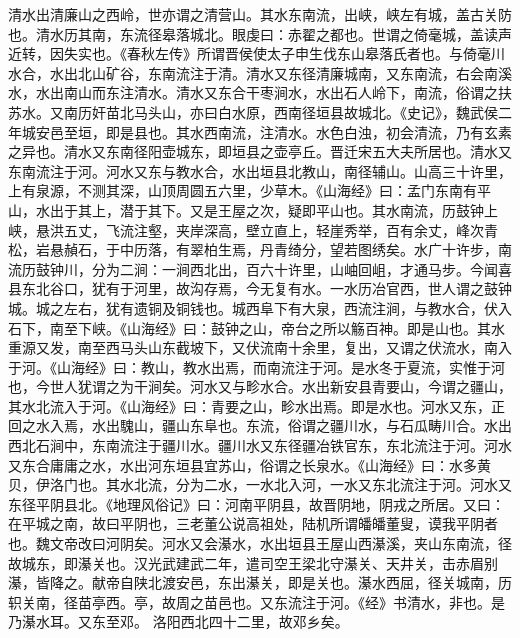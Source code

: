 \documentclass[12pt,UTF8]{ctexbook}
\begin{document}
清水出清廉山之西岭，世亦谓之清营山。其水东南流，出峡，峡左有城，盖古关防也。清水历其南，东流径皋落城北。眼虔曰：赤翟之都也。世谓之倚毫城，盖读声近转，因失实也。《春秋左传》所谓晋侯使太子申生伐东山皋落氏者也。与倚毫川水合，水出北山矿谷，东南流注于清。清水又东径清廉城南，又东南流，右会南溪水，水出南山而东注清水。清水又东合干枣涧水，水出石人岭下，南流，俗谓之扶苏水。又南历奸苗北马头山，亦曰白水原，西南径垣县故城北。《史记》，魏武侯二年城安邑至垣，即是县也。其水西南流，注清水。水色白浊，初会清流，乃有玄素之异也。清水又东南径阳壶城东，即垣县之壶亭丘。晋迁宋五大夫所居也。清水又东南流注于河。河水又东与教水合，水出垣县北教山，南径辅山。山高三十许里，上有泉源，不测其深，山顶周圆五六里，少草木。《山海经》曰：孟门东南有平山，水出于其上，潜于其下。又是王屋之次，疑即平山也。其水南流，历鼓钟上峡，悬洪五丈，飞流注壑，夹岸深高，壁立直上，轻崖秀举，百有余丈，峰次青松，岩悬赬石，于中历落，有翠柏生焉，丹青绮分，望若图绣矣。水广十许步，南流历鼓钟川，分为二涧：一涧西北出，百六十许里，山岫回岨，才通马步。今闻喜县东北谷口，犹有于河里，故沟存焉，今无复有水。一水历冶官西，世人谓之鼓钟城。城之左右，犹有遗铜及铜钱也。城西阜下有大泉，西流注涧，与教水合，伏入石下，南至下峡。《山海经》曰：鼓钟之山，帝台之所以觞百神。即是山也。其水重源又发，南至西马头山东截坡下，又伏流南十余里，复出，又谓之伏流水，南入于河。《山海经》曰：教山，教水出焉，而南流注于河。是水冬于夏流，实惟于河也，今世人犹谓之为干涧矣。河水又与畛水合。水出新安县青要山，今谓之疆山，其水北流入于河。《山海经》曰：青要之山，畛水出焉。即是水也。河水又东，正回之水入焉，水出騩山，疆山东阜也。东流，俗谓之疆川水，与石瓜畴川合。水出西北石涧中，东南流注于疆川水。疆川水又东径疆冶铁官东，东北流注于河。河水又东合庸庸之水，水出河东垣县宜苏山，俗谓之长泉水。《山海经》曰：水多黄贝，伊洛门也。其水北流，分为二水，一水北入河，一水又东北流注于河。河水又东径平阴县北。《地理风俗记》曰：河南平阴县，故晋阴地，阴戎之所居。又曰：在平城之南，故曰平阴也，三老董公说高祖处，陆机所谓皤皤董叟，谟我平阴者也。魏文帝改曰河阴矣。河水又会濝水，水出垣县王屋山西濝溪，夹山东南流，径故城东，即濝关也。汉光武建武二年，遣司空王梁北守濝关、天井关，击赤眉别濝，皆降之。献帝自陕北渡安邑，东出濝关，即是关也。濝水西屈，径关城南，历轵关南，径苗亭西。亭，故周之苗邑也。又东流注于河。《经》书清水，非也。是乃濝水耳。又东至邓。
洛阳西北四十二里，故邓乡矣。
\end{document}
